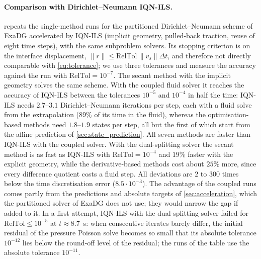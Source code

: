 \documentclass[11pt,a4paper]{article}
\theoremstyle{definition}
\theoremstyle{remark}
\begin{document}
\paragraph{Comparison with Dirichlet--Neumann IQN-ILS.}  repeats the
single-method runs for the partitioned Dirichlet--Neumann scheme of ExaDG accelerated by IQN-ILS
(implicit geometry, pulled-back traction, reuse of eight time steps), with the same subproblem
solvers. Its stopping criterion is on the interface displacement,
$\|r\|\le\mathrm{RelTol}\,\|v_s\|\Delta t$, and therefore not directly comparable with
\eqref{eq:tolerance}; we use three tolerances and measure the accuracy against the run with
$\mathrm{RelTol}=10^{-7}$. The secant method with the implicit geometry solves the same scheme.
With the coupled fluid solver it reaches the accuracy of IQN-ILS between the tolerances $10^{-5}$
and $10^{-4}$ in half the time: IQN-ILS needs $2.7$--$3.1$ Dirichlet--Neumann iterations per step,
each with a fluid solve from the extrapolation ($89\%$ of its time in the fluid), whereas the
optimisation-based methods need $1.8$--$1.9$ states per step, all but the first of which start from
the affine prediction of \cref{sec:state_prediction}. All seven methods are faster than IQN-ILS
with the coupled solver. With the dual-splitting solver the secant method is as fast as IQN-ILS with
$\mathrm{RelTol}=10^{-4}$ and $19\%$ faster with the explicit geometry, while the derivative-based
methods cost about $25\%$ more, since every difference quotient costs a fluid step. All deviations
are $2$ to $300$ times below the time discretisation error ($8.5\cdot10^{-3}$). The advantage of the
coupled runs comes partly from the predictions and absolute targets of \cref{sec:acceleration},
which the partitioned solver of ExaDG does not use; they would narrow the gap if added to it. In a
first attempt, IQN-ILS with the dual-splitting solver failed for $\mathrm{RelTol}\le10^{-5}$ at
$t\approx8.7$~s: when consecutive iterates barely differ, the initial residual of the pressure
Poisson solve becomes so small that its absolute tolerance $10^{-12}$ lies below the round-off
level of the residual; the runs of the table use the absolute tolerance $10^{-11}$.
\end{document}
